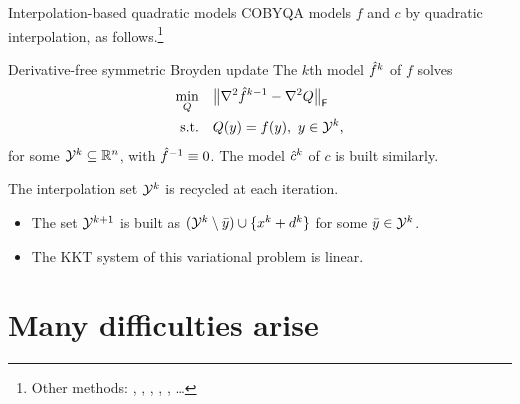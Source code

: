 \documentclass[
]{presentation}
\newcommand{\obj}{f}
\newcommand{\objm}[1][]{\hat{f}\ifblank{#1}{}{^{#1}}}
\newcommand{\con}{c}
\newcommand{\conm}[1][]{\hat{c}\ifblank{#1}{}{^{#1}}}
\newcommand{\iter}[1][]{x\ifblank{#1}{}{^{#1}}}
\newcommand{\step}[1][]{d\ifblank{#1}{}{^{#1}}}
\newcommand{\xpt}[1][]{\mathcal{Y}\ifblank{#1}{}{^{#1}}}
\begin{document}
\begin{frame}{Interpolation-based quadratic models}
    COBYQA models $\obj$ and $\con$ by \alert{quadratic} interpolation, as follows.\footnote{Other methods: \textcite{Conn_Scheinberg_Toint_1997a,Conn_Scheinberg_Toint_1997b,Conn_Scheinberg_Toint_1998}, \textcite{Wild_2008}, \textcite{Bandeira_Scheinberg_Vicente_2012}, \textcite{Zhang_2014}, \textcite{Xie_Yuan_2023}, \dots}

    \begin{block}{Derivative-free symmetric Broyden update \parencite{Powell_2004b}}
        The $k$th model $\objm[k]$ of $\obj$ solves
        \begin{align*}
            \min_Q          & \quad \norm[\big]{\nabla^2 \objm[k - 1] - \nabla^2 Q}_{\mathsf{F}}\\
            \textrm{s.t.}   & \quad Q(y) = \obj(y), ~ y \in \xpt[k],
        \end{align*}
        for some $\xpt[k] \subseteq \R^n$, with $\objm[-1] \equiv 0$.
        The model $\conm[k]$ of $\con$ is built similarly.
    \end{block}

    The interpolation set $\xpt[k]$ is \alert{recycled} at each iteration.
    \begin{itemize}
        \item The set $\xpt[k + 1]$ is built as $(\xpt[k] \setminus {\bar{y}}) \cup \set{\iter[k] + \step[k]}$ for some $\bar{y} \in \xpt[k]$.
        \item The KKT system of this variational problem is \alert{linear}.
    \end{itemize}
\end{frame}

\section{Many difficulties arise}
\end{document}
